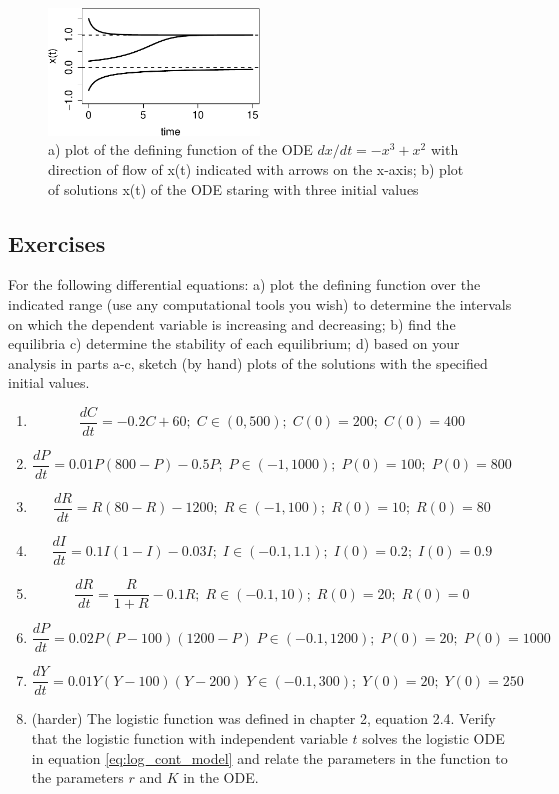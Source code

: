 \documentclass[
  letterpaper,
  DIV=11,
  numbers=noendperiod]{scrreprt}
\begin{document}
\begin{figure}

{\centering \includegraphics[width=0.5\textwidth,height=\textheight]{./graph_odes_files/figure-pdf/ch7-flow3-2.pdf}

}

\caption{a) plot of the defining function of the ODE
\(dx/dt = -x^3 + x^2\) with direction of flow of x(t) indicated with
arrows on the x-axis; b) plot of solutions x(t) of the ODE staring with
three initial values}

\end{figure}

\hypertarget{exercises-21}{%
\subsection{Exercises}\label{exercises-21}}

For the following differential equations: a) plot the defining function
over the indicated range (use any computational tools you wish) to
determine the intervals on which the dependent variable is increasing
and decreasing; b) find the equilibria c) determine the stability of
each equilibrium; d) based on your analysis in parts a-c, sketch (by
hand) plots of the solutions with the specified initial values.

\begin{enumerate}
\def\labelenumi{\arabic{enumi}.}
\item
  \[ \frac{dC}{dt} = -0.2C + 60; \; C \in (0,500); \; C(0) = 200; \; C(0) = 400 \]
\item
  \[ \frac{dP}{dt} = 0.01P(800-P) - 0.5P; \; P \in (-1, 1000); \; P(0) = 100; \; P(0) = 800\]
\item
  \[ \frac{dR}{dt} = R(80-R) - 1200; \; R \in (-1, 100); \; R(0) = 10; \; R(0) = 80\]
\item
  \[ \frac{dI}{dt} = 0.1I(1-I) - 0.03I; \;  I \in (-0.1, 1.1); \; I(0) = 0.2; \; I(0) = 0.9 \]
\item
  \[  \frac{dR}{dt} = \frac{R}{1+R}-0.1R; \; R \in (-0.1, 10); \; R(0) = 20; \; R(0) = 0 \]
\item
  \[  \frac{dP}{dt} =  0.02P(P-100)(1200-P) \; P \in (-0.1, 1200); \; P(0) = 20; \; P(0) = 1000 \]
\item
  \[  \frac{dY}{dt} =  0.01Y(Y-100)(Y-200) \; Y \in (-0.1, 300); \; Y(0) = 20; \; Y(0) = 250 \]
\item
  (harder) The logistic function
  was defined in chapter
  2, equation 2.4. Verify that the logistic function with independent
  variable \(t\) solves the logistic ODE in equation
  \ref{eq:log_cont_model} and relate the parameters in the function to
  the parameters \(r\) and \(K\) in the ODE.
\end{enumerate}
\end{document}
